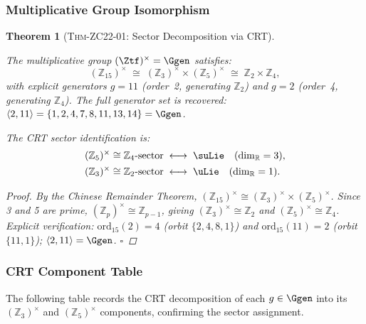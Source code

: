 \documentclass[12pt, a4paper]{article}
\newtheorem{theorem}{Theorem}[section]
\begin{document}
\subsubsection{Multiplicative Group Isomorphism}

\begin{theorem}[\textsc{Thm-ZC22-01}: Sector Decomposition via CRT]
\label{zc22:thm:sector}
\begin{derivedbox}[title={THM-ZC22-01 (Confirmed)}]
The multiplicative group $(\Ztf)^\times = \Ggen$ satisfies:
\begin{equation}
  (\mathbb{Z}_{15})^\times
  \;\cong\; (\mathbb{Z}_3)^\times \times (\mathbb{Z}_5)^\times
  \;\cong\; \mathbb{Z}_2 \times \mathbb{Z}_4,
  \tag{THM-ZC22-01}
\end{equation}
with explicit generators $g = 11$ (order~2, generating $\mathbb{Z}_2$)
and $g = 2$ (order~4, generating $\mathbb{Z}_4$).
The full generator set is recovered:
$\langle 2, 11\rangle = \{1, 2, 4, 7, 8, 11, 13, 14\} = \Ggen$.

The CRT sector identification is:
\begin{align*}
  (\mathbb{Z}_5)^\times \cong \mathbb{Z}_4\text{-sector}
    &\;\longleftrightarrow\; \suLie
    \quad (\dim_\mathbb{R} = 3), \\
  (\mathbb{Z}_3)^\times \cong \mathbb{Z}_2\text{-sector}
    &\;\longleftrightarrow\; \uLie
    \quad (\dim_\mathbb{R} = 1).
\end{align*}
\end{derivedbox}
\begin{proof}
By the Chinese Remainder Theorem,
$(\mathbb{Z}_{15})^\times \cong (\mathbb{Z}_3)^\times \times (\mathbb{Z}_5)^\times$.
Since 3 and 5 are prime,
$(\mathbb{Z}_p)^\times \cong \mathbb{Z}_{p-1}$,
giving $(\mathbb{Z}_3)^\times \cong \mathbb{Z}_2$ and
$(\mathbb{Z}_5)^\times \cong \mathbb{Z}_4$.
Explicit verification: $\mathrm{ord}_{15}(2) = 4$
(orbit $\{2,4,8,1\}$) and $\mathrm{ord}_{15}(11) = 2$
(orbit $\{11,1\}$);
$\langle 2,11\rangle = \Ggen$. \hfill$\square$
\end{proof}
\end{theorem}

\subsubsection{CRT Component Table}

The following table records the CRT decomposition of each $g \in \Ggen$
into its $(\mathbb{Z}_3)^\times$ and $(\mathbb{Z}_5)^\times$ components,
confirming the sector assignment.
\end{document}
